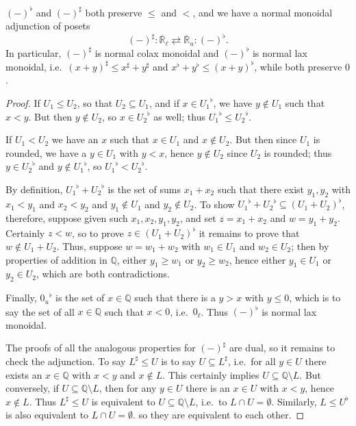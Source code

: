\documentclass{article}
\def\Q{\mathbb{Q}}
\def\R{\mathbb{R}}
\def\Re{\overline{\R}}
\def\Reu{\Re_u}
\def\Rel{\Re_{\ell}}
\def\upp#1{{#1}^{\sharp}}
\def\low#1{{#1}^{\flat}}
\begin{document}
\begin{thm}
  $\low{(-)}$ and $\upp{(-)}$ both preserve $\le$ and $<$, and we have a normal monoidal adjunction of posets
  \[ \upp{(-)} : \Rel \rightleftarrows \Reu : \low{(-)}.\]
  In particular, $\upp{(-)}$ is normal colax monoidal and $\low{(-)}$ is normal lax monoidal, i.e.\ $\upp{(x+y)} \le \upp{x}+\upp{y}$ and $\low{x}+\low{y}\le \low{(x+y)}$, while both preserve $0$.
\end{thm}
\begin{proof}
  If $U_1 \le U_2$, so that $U_2\subseteq U_1$, and if $x\in\low{U_1}$, we have $y\notin U_1$ such that $x<y$.
  But then $y\notin U_2$, so $x\in \low{U_2}$ as well; thus $\low{U_1}\le \low{U_2}$.

  If $U_1 < U_2$ we have an $x$ such that $x\in U_1$ and $x\notin U_2$.
  But then since $U_1$ is rounded, we have a $y\in U_1$ with $y<x$, hence $y\notin U_2$ since $U_2$ is rounded; thus $y \in \low{U_2}$ and $y\notin \low{U_1}$, so $\low{U_1} < \low{U_2}$.

  By definition, $\low{U_1} +\low{U_2}$ is the set of sums $x_1+x_2$ such that there exist $y_1,y_2$ with $x_1<y_1$ and $x_2<y_2$ and $y_1\notin U_1$ and $y_2\notin U_2$.
  To show $\low{U_1} +\low{U_2} \subseteq \low{(U_1+U_2)}$, therefore, suppose given such $x_1,x_2,y_1,y_2$, and set $z=x_1+x_2$ and $w = y_1+y_2$.
  Certainly $z<w$, so to prove $z\in \low{(U_1 + U_2)}$ it remains to prove that $w\notin U_1+U_2$.
  Thus, suppose $w = w_1+w_2$ with $w_1\in U_1$ and $w_2\in U_2$; then by properties of addition in $\Q$, either $y_1\ge w_1$ or $y_2\ge w_2$, hence either $y_1\in U_1$ or $y_2\in U_2$, which are both contradictions.

  Finally, $\low{0_u}$ is the set of $x\in \Q$ such that there is a $y>x$ with $y\le 0$, which is to say the set of all $x\in \Q$ such that $x<0$, i.e.\ $0_\ell$.
  Thus $\low{(-)}$ is normal lax monoidal.

  The proofs of all the analogous properties for $\upp{(-)}$ are dual, so it remains to check the adjunction.
  To say $\upp L \le U$ is to say $U \subseteq \upp L$, i.e.\ for all $y\in U$ there exists an $x\in \Q$  with $x<y$ and $x\notin L$.
  This certainly implies $U \subseteq \Q\setminus L$.
  But conversely, if $U \subseteq \Q\setminus L$, then for any $y\in U$ there is an $x\in U$ with $x<y$, hence $x\notin L$.
  Thus $\upp L \le U$ is equivalent to $U \subseteq \Q\setminus L$, i.e.\ to $L\cap U = \emptyset$.
  Similarly, $L \le \low U$ is also equivalent to $L\cap U =\emptyset$. so they are equivalent to each other.
\end{proof}
\end{document}
